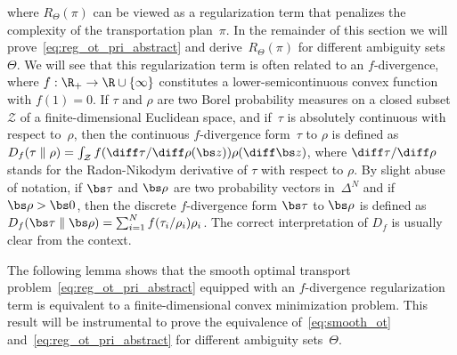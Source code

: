 \documentclass[11pt, a4paper, oneside, reqno]{article}
\begin{document}
	where $R_\Theta(\pi)$ can be viewed as a regularization term that penalizes the complexity of the transportation plan~$\pi$. 
	In the remainder of this section we will prove~\eqref{eq:reg_ot_pri_abstract} and derive~$R_\Theta(\pi)$ for different ambiguity sets~$\Theta$. We will see that this regularization term is often related to an $f$-divergence, where $f:\R_+ \to \R \cup \{\infty\}$ constitutes a lower-semicontinuous convex function with $f(1) = 0$. If $\tau$ and $\rho$ are two Borel probability measures on a closed subset $\mathcal Z$ of a finite-dimensional Euclidean space, and if~$\tau$ is absolutely continuous with respect to~$\rho$, then the continuous $f$-divergence form~$\tau$ to $\rho$ is defined as 
	$D_f(\tau \parallel \rho) = \int_{\mathcal Z}  f({\diff \tau}/{\diff \rho}(\bs z)) \rho(\diff \bs z)$, where ${\diff \tau}/{\diff \rho}$ stands for the Radon-Nikodym derivative of $\tau$ with respect to $\rho$. By slight abuse of notation, if $\bs \tau$ and $\bs \rho$ are two probability vectors in~$\Delta^N$ and if $\bs\rho>\bs 0$, then the discrete $f$-divergence form $\bs \tau$ to $\bs \rho$ is defined as
	$D_f(\bs \tau \parallel \bs \rho) = \sum_{i =1}^N f({\tau_i}/{\rho_i}) \rho_i$. The correct interpretation of $D_f$ is usually clear from the context.
	
	The following lemma shows that the smooth optimal transport problem~\eqref{eq:reg_ot_pri_abstract} equipped with an $f$-divergence regularization term is equivalent to a finite-dimensional convex minimization problem. This result will be instrumental to prove the equivalence of~\eqref{eq:smooth_ot} and~\eqref{eq:reg_ot_pri_abstract} for different ambiguity sets~$\Theta$.
	
\end{document}
